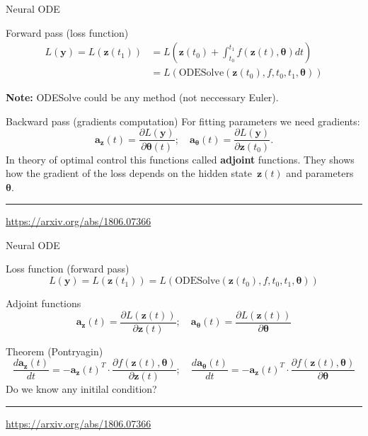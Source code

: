 \documentclass{beamer}
\newcommand{\ba}{\mathbf{a}}
\newcommand{\bz}{\mathbf{z}}
\newcommand{\by}{\mathbf{y}}
\newcommand{\btheta}{\boldsymbol{\theta}}
\begin{document}
\begin{frame}{Neural ODE}
	\begin{block}{Forward pass (loss function)}
		\vspace{-0.5cm}
		\begin{align*}
			L(\by) = L(\bz(t_1)) &= L\left( \bz(t_0) + \int_{t_0}^{t_1} f(\bz(t), \btheta) dt \right) \\ &= L\left(\text{ODESolve}(\bz(t_0), f, t_0,t_1, \btheta) \right)
		\end{align*}
	\vspace{-0.5cm}
	\end{block}
	\textbf{Note:} ODESolve could be any method (not neccessary Euler).
	\begin{block}{Backward pass (gradients computation)}
		For fitting parameters we need gradients:
		\[
		\ba_{\bz}(t) = \frac{\partial L(\by)}{\partial \btheta(t)}; \quad \ba_{\btheta}(t) = \frac{\partial L(\by)}{\partial \bz(t_0)}.
		\]
		In theory of optimal control this functions called \textbf{adjoint} functions. 
		They shows how the gradient of the loss depends on the hidden state~$\bz(t)$ and parameters $\btheta$.
	\end{block}
	\vspace{0.1cm}
		
	\hrule\medskip
	{\scriptsize \href{https://arxiv.org/abs/1806.07366}{https://arxiv.org/abs/1806.07366}}   
\end{frame}
\begin{frame}{Neural ODE}
	\begin{block}{Loss function (forward pass)}
	\vspace{-0.2cm}
	\[
	    L(\by) = L(\bz(t_1)) = L\left(\text{ODESolve}(\bz(t_0), f, t_0,t_1, \btheta) \right)
	\]
	\vspace{-0.3cm}
	\end{block}
	\begin{block}{Adjoint functions}
	\vspace{-0.2cm}
	\[
	    \ba_{\bz}(t) = \frac{\partial L(\bz(t))}{\partial \bz(t)}; \quad \ba_{\btheta}(t) = \frac{\partial L(\bz(t))}{\partial \btheta}
	\]
	\vspace{-0.2cm}
	\end{block}
	\begin{block}{Theorem (Pontryagin)}
	\vspace{-0.3cm}
	\[
	    \frac{d \ba_{\bz}(t)}{dt} = - \ba_{\bz}(t)^T \cdot \frac{\partial f(\bz(t), \btheta)}{\partial \bz(t)}; \quad  \frac{d \ba_{\btheta}(t)}{dt} = - \ba_{\bz}(t)^T \cdot \frac{\partial f(\bz(t), \btheta)}{\partial \btheta}
	\]
	Do we know any initilal condition?
	\end{block}
	 \vfill
	\hrule\medskip
	{\scriptsize \href{https://arxiv.org/abs/1806.07366}{https://arxiv.org/abs/1806.07366}}   
\end{frame}
\end{document}
